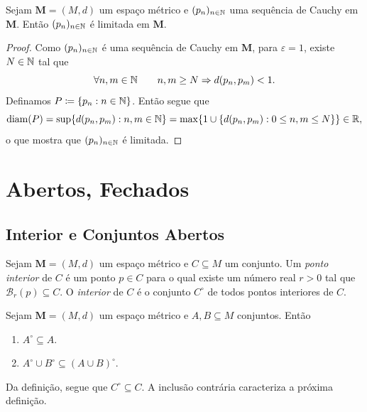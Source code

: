 \begin{prop}
	Sejam $\bm M = (M,d)$ um espaço métrico e $(p_n)_{n \in \mathbb{N}}$ uma sequência de Cauchy em $\bm M$. Então $(p_n)_{n \in \mathbb{N}}$ é limitada em $\bm M$.
\end{prop}
\begin{proof}
	Como $(p_n)_{n \in \mathbb{N}}$ é uma sequência de Cauchy em $\bm M$, para $\varepsilon=1$, existe $N \in \mathbb{N}$ tal que
	\begin{equation*}
	\forall n,m \in \mathbb{N} \qquad n,m \geq N \Rightarrow d(p_n,p_m)<1.
	\end{equation*}
	Definamos $P \coloneqq \{p_n : n \in \N\}$. Então segue que
	\begin{equation*}
	\operatorname{diam}(P) = \sup \{d(p_n,p_m) : n,m \in \mathbb{N}\} = \max\{1 \cup \{d(p_n,p_m) : 0 \leq n,m \leq N\}\} \in \mathbb{R},
	\end{equation*}
o que mostra que $(p_n)_{n \in \mathbb{N}}$ é limitada.
\end{proof}

\section{Abertos, Fechados}

\subsection{Interior e Conjuntos Abertos}

\begin{defi}
	Sejam $\bm M = (M,d)$ um espaço métrico e $C \subseteq M$ um conjunto. Um \emph{ponto interior} de $C$ é um ponto $p \in C$ para o qual existe um número real $r > 0$ tal que $\mathcal B_r(p) \subseteq C$. O \emph{interior} de $C$ é o conjunto $C^\circ$ de todos pontos interiores de $C$.
\end{defi}


\begin{prop}
	Sejam $\bm M = (M,d)$ um espaço métrico e $A,B \subseteq M$ conjuntos. Então
	\begin{enumerate}
	\item $A^\circ \subseteq A$.
	\item $A^\circ \cup B^\circ \subseteq (A \cup B)^\circ$.
	\end{enumerate}
\end{prop}

Da definição, segue que $C^\circ \subseteq C$. A inclusão contrária caracteriza a próxima definição.

